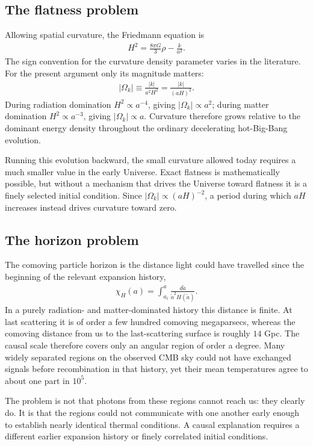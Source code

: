 \documentclass[12pt]{article}
\newcommand{\be}{\begin{eqnarray}}
\newcommand{\ee}{\end{eqnarray}}
\begin{document}
\subsection{The flatness problem}
Allowing spatial curvature, the Friedmann equation is
\be
H^2=\frac{8\pi G}{3}\rho-\frac{k}{a^2}.
\ee
The sign convention for the curvature density parameter varies in the literature.
For the present argument only its magnitude matters:
\be
|\Omega_k|\equiv\frac{|k|}{a^2H^2}=\frac{|k|}{(aH)^2}.
\ee
During radiation domination $H^2\propto a^{-4}$, giving
$|\Omega_k|\propto a^2$; during matter domination $H^2\propto a^{-3}$,
giving $|\Omega_k|\propto a$. Curvature therefore grows relative to the dominant
energy density throughout the ordinary decelerating hot-Big-Bang evolution.

Running this evolution backward, the small curvature allowed today requires a much
smaller value in the early Universe. Exact flatness is mathematically possible, but
without a mechanism that drives the Universe toward flatness it is a finely selected
initial condition. Since $|\Omega_k|\propto(aH)^{-2}$, a period during which $aH$
increases instead drives curvature toward zero.

\subsection{The horizon problem}
The comoving particle horizon is the distance light could have travelled since the
beginning of the relevant expansion history,
\be
\chi_H(a)=\int_{a_i}^{a}\frac{d\tilde a}{\tilde a^2H(\tilde a)}.
\ee
In a purely radiation- and matter-dominated history this distance is finite. At last
scattering it is of order a few hundred comoving megaparsecs, whereas the comoving
distance from us to the last-scattering surface is roughly $14$ Gpc. The causal scale
therefore covers only an angular region of order a degree. Many widely separated
regions on the observed CMB sky could not have exchanged signals before
recombination in that history, yet their mean temperatures agree to about one part
in $10^5$.

The problem is not that photons from these regions cannot reach us: they clearly do.
It is that the regions could not communicate with one another early enough to
establish nearly identical thermal conditions. A causal explanation requires a
different earlier expansion history or finely correlated initial conditions.
\end{document}
